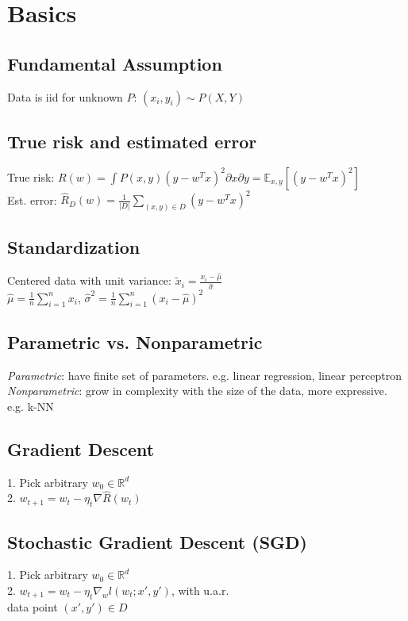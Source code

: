 \section*{Basics}

\subsection*{Fundamental Assumption}
Data is iid for unknown $P$: $(x_i, y_i) \sim P(X,Y)$

\subsection*{True risk and estimated error}
True risk: $R(w) = \int P(x,y) (y-w^Tx)^2 \partial x \partial y = \mathbb{E}_{x,y}[(y-w^Tx)^2]$ \\
Est. error: $\hat{R}_D(w) = \frac{1}{|D|}\sum_{(x,y)\in D} (y-w^Tx)^2$

\subsection*{Standardization}
Centered data with unit variance:
$\tilde{x}_{i} = \frac{x_{i}-\hat{\mu}}{\hat{\sigma}}$\\
$\hat{\mu} = \frac{1}{n}\sum_{i=1}^n x_{i}$, $\hat{\sigma}^2 = \frac{1}{n}\sum_{i=1}^n {(x_{i}-\hat{\mu})}^2$ 

\subsection*{Parametric vs. Nonparametric}
\emph{Parametric}: have finite set of parameters. 
e.g. linear regression, linear perceptron\\
\emph{Nonparametric}: grow in complexity with the size of the data, more expressive.
e.g. k-NN

\subsection*{Gradient Descent}
1. Pick arbitrary $w_0 \in \mathbb{R}^d$\\
2. $w_{t+1} = w_t - \eta_t \nabla \hat{R}(w_t)$

\subsection*{Stochastic Gradient Descent (SGD)}
1. Pick arbitrary $w_0 \in \mathbb{R}^d$\\
2. $w_{t+1} = w_t - \eta_t \nabla_w l(w_t;x',y')$, with u.a.r.\\ data point $(x',y') \in D$
